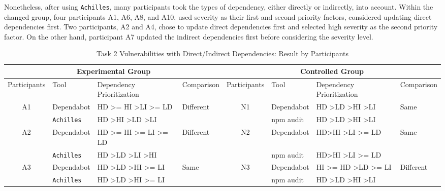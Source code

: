 \documentclass[conference]{IEEEtran}
\begin{document}
	Nonetheless, after using \texttt{Achilles}, many participants took the types of dependency, either directly or indirectly, into account. Within the changed group, four participants A1, A6, A8, and A10, used severity as their first and second priority factors, considered updating direct dependencies first. Two participants, A2 and A4, chose to update direct dependencies first and selected high severity as the second priority factor. On the other hand, participant A7 updated the indirect dependencies first before considering the severity level.
	
	
	
	\begin{table}[tb]
		\caption{Task 2 Vulnerabilities with Direct/Indirect Dependencies: Result by Participants}
		\centering
		\begin{tabular}{clll|clll}
			\toprule
			\multicolumn{4}{c|}{Experimental Group} & \multicolumn{4}{c}{Controlled Group}  \\ 
			\midrule
			Participants         & Tool       & Dependency Prioritization & Comparison & Participants & Tool  & Dependency Prioritization & Comparison \\ 
			\midrule
			\multirow{2}{*}{A1}  & Dependabot & HD \textgreater{}= HI \textgreater LI \textgreater{}= LD    & \multirow{2}{*}{Different}      & \multirow{2}{*}{N1} & Dependabot & HD \textgreater LD \textgreater HI \textgreater LI  & \multirow{2}{*}{Same} \\ 
			& \texttt{Achilles}   & HD \textgreater HI \textgreater LD \textgreater LI & & & npm audit & HD \textgreater LD \textgreater HI \textgreater LI & \\ 
			\midrule
			\multirow{2}{*}{A2}  & Dependabot & HD \textgreater{}= HI \textgreater{}= LI \textgreater{}= LD & \multirow{2}{*}{Different}      & \multirow{2}{*}{N2} & Dependabot & HD\textgreater HI \textgreater LI \textgreater = LD &  \multirow{2}{*}{Same} \\
			& \texttt{Achilles}   & HD \textgreater LD \textgreater LI \textgreater HI & & & npm audit & HD\textgreater HI \textgreater LI \textgreater = LD &  \\ 
			\midrule
			\multirow{2}{*}{A3}  & Dependabot & HD \textgreater LD \textgreater HI \textgreater{}= LI & \multirow{2}{*}{Same} & \multirow{2}{*}{N3} & Dependabot & HI \textgreater{}= HD \textgreater LD \textgreater{}= LI &  \multirow{2}{*}{Different} \\ 
			& \texttt{Achilles}   & HD \textgreater LD \textgreater HI \textgreater{}= LI & & & npm audit & HD \textgreater LD \textgreater HI \textgreater LI  & \\ 

\end{tabular}
\end{table}
\end{document}
